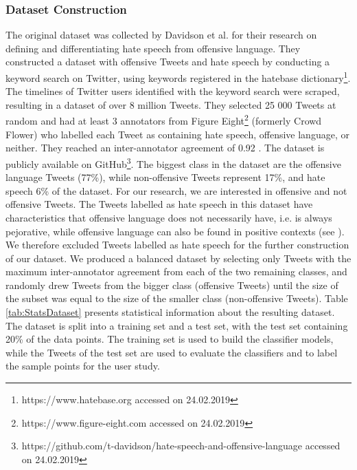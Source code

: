 \subsubsection{Dataset Construction}
The original dataset was collected by Davidson et al. \cite{davidson2017automated} for their research on defining and differentiating hate speech from offensive language. They constructed a dataset with offensive Tweets and hate speech by conducting a keyword search on Twitter, using keywords registered in the hatebase dictionary\footnote{https://www.hatebase.org accessed on 24.02.2019}. The timelines of Twitter users identified with the keyword search were scraped, resulting in a dataset of over 8 million Tweets. They selected 25 000 Tweets at random and had at least 3 annotators from Figure Eight\footnote{https://www.figure-eight.com accessed on 24.02.2019} (formerly Crowd Flower) who labelled each Tweet as containing hate speech, offensive language, or neither. They reached an inter-annotator agreement of 0.92 \cite{davidson2017automated}. The dataset is publicly available on GitHub\footnote{https://github.com/t-davidson/hate-speech-and-offensive-language accessed on 24.02.2019}.\newline
The biggest class in the dataset are the offensive language Tweets (77\%), while non-offensive Tweets represent 17\%, and hate speech 6\% of the dataset. \newline
For our research, we are interested in offensive and not offensive Tweets. The Tweets labelled as hate speech in this dataset have characteristics that offensive language does not necessarily have, i.e. is always pejorative, while offensive language can also be found in positive contexts (see \cite{davidson2017automated}). We therefore excluded Tweets labelled as hate speech for the further construction of our dataset. We produced a balanced dataset by selecting only Tweets with the maximum inter-annotator agreement from each of the two remaining classes, and randomly drew Tweets from the bigger class (offensive Tweets) until the size of the subset was equal to the size of the smaller class (non-offensive Tweets). Table \ref{tab:StatsDataset} presents statistical information about the resulting dataset.\newline
The dataset is split into a training set and a test set, with the test set containing 20\% of the data points. The training set is used to build the classifier models, while the Tweets of the test set are used to evaluate the classifiers and to label the sample points for the user study.
